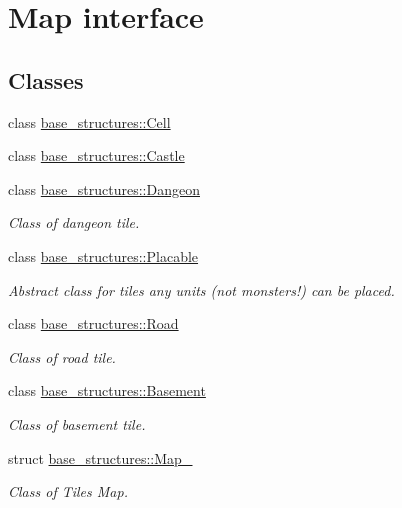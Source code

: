 \hypertarget{group__map__interface}{}\section{Map interface}
\label{group__map__interface}
\subsection*{Classes}
\begin{DoxyCompactItemize}
\item 
class \hyperlink{classbase__structures_1_1Cell}{base\+\_\+structures\+::\+Cell}
\item 
class \hyperlink{classbase__structures_1_1Castle}{base\+\_\+structures\+::\+Castle}
\item 
class \hyperlink{classbase__structures_1_1Dangeon}{base\+\_\+structures\+::\+Dangeon}
\begin{DoxyCompactList}\small\item\em Class of dangeon tile. \end{DoxyCompactList}\item 
class \hyperlink{classbase__structures_1_1Placable}{base\+\_\+structures\+::\+Placable}
\begin{DoxyCompactList}\small\item\em Abstract class for tiles any units (not monsters!) can be placed. \end{DoxyCompactList}\item 
class \hyperlink{classbase__structures_1_1Road}{base\+\_\+structures\+::\+Road}
\begin{DoxyCompactList}\small\item\em Class of road tile. \end{DoxyCompactList}\item 
class \hyperlink{classbase__structures_1_1Basement}{base\+\_\+structures\+::\+Basement}
\begin{DoxyCompactList}\small\item\em Class of basement tile. \end{DoxyCompactList}\item 
struct \hyperlink{structbase__structures_1_1Map__}{base\+\_\+structures\+::\+Map\+\_\+}
\begin{DoxyCompactList}\small\item\em Class of Tiles Map. \end{DoxyCompactList}\end{DoxyCompactItemize}
